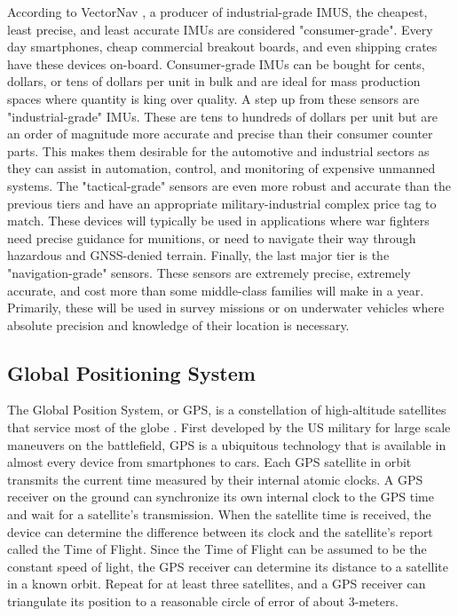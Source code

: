 According to VectorNav \cite{VectorNav:2023}, a producer of industrial-grade IMUS, the cheapest, least precise, and least accurate IMUs are considered "consumer-grade".
Every day smartphones, cheap commercial breakout boards, and even shipping crates have these devices on-board.
Consumer-grade IMUs can be bought for cents, dollars, or tens of dollars per unit in bulk and are ideal for mass production spaces where quantity is king over quality.
A step up from these sensors are "industrial-grade" IMUs. 
These are tens to hundreds of dollars per unit but are an order of magnitude more accurate and precise than their consumer counter parts.
This makes them desirable for the automotive and industrial sectors as they can assist in automation, control, and monitoring of expensive unmanned systems.
The "tactical-grade" sensors are even more robust and accurate than the previous tiers and have an appropriate military-industrial complex price tag to match. 
These devices will typically be used in applications where war fighters need precise guidance for munitions, or need to navigate their way through hazardous and GNSS-denied terrain.
Finally, the last major tier is the "navigation-grade" sensors. 
These sensors are extremely precise, extremely accurate, and cost more than some middle-class families will make in a year.
Primarily, these will be used in survey missions or on underwater vehicles where absolute precision and knowledge of their location is necessary.

\subsection{Global Positioning System} 
The Global Position System, or GPS, is a constellation of high-altitude satellites that service most of the globe \cite{Hofmann:2001}.
First developed by the US military for large scale maneuvers on the battlefield, GPS is a ubiquitous technology that is available in almost every device from smartphones to cars.
Each GPS satellite in orbit transmits the current time measured by their internal atomic clocks.
A GPS receiver on the ground can synchronize its own internal clock to the GPS time and wait for a satellite's transmission.
When the satellite time is received, the device can determine the difference between its clock and the satellite's report called the Time of Flight.
Since the Time of Flight can be assumed to be the constant speed of light, the GPS receiver can determine its distance to a satellite in a known orbit.
Repeat for at least three satellites, and a GPS receiver can triangulate its position to a reasonable circle of error of about 3-meters.

